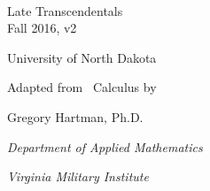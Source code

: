 


\begin{flushright}

\textsc{\large \apex\ {\Huge\thetitle}} \\

Late Transcendentals \\
Fall 2016, v2 \\


\Large

University of North Dakota\bigskip

\normalsize

Adapted from \apex\ Calculus by

Gregory Hartman, Ph.D.

\emph{\small Department of Applied Mathematics}

\emph{\small Virginia Military Institute}

\end{flushright}
\normalsize
{}
\restoregeometry
